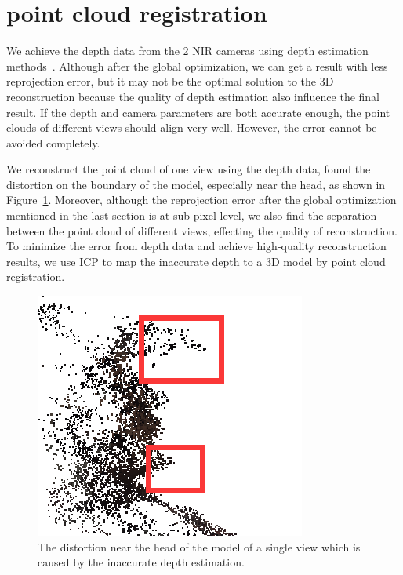\section{point cloud registration}
\label{sec:registration}

We achieve the depth data from the 2 NIR cameras using depth estimation methods~\cite{Bleyer2011PatchMatch}. Although after the global optimization, we can get a result with less reprojection error, but it may not be the optimal solution to the 3D reconstruction because the quality of depth estimation also influence the final result. If the depth and camera parameters are both accurate enough, the point clouds of different views should align very well. 
However, the error cannot be avoided completely.

We reconstruct the point cloud of one view using the depth data, found the distortion on the boundary of the model, especially near the head, as shown in Figure~\ref{fig:deptherror}. Moreover, although the reprojection error after the global optimization mentioned in the last section is at sub-pixel level, we also find the separation between the point cloud of different views, effecting the quality of reconstruction. 
%
To minimize the error from depth data and achieve high-quality reconstruction results, we use ICP to map the inaccurate depth to a 3D model by point cloud registration.
\begin{figure}[ht]
\centering
\includegraphics[scale=0.4]{image/depth_error.png}
\caption{The distortion near the head of the model of a single view which is caused by the inaccurate depth estimation. }
\label{fig:deptherror}
\end{figure}



